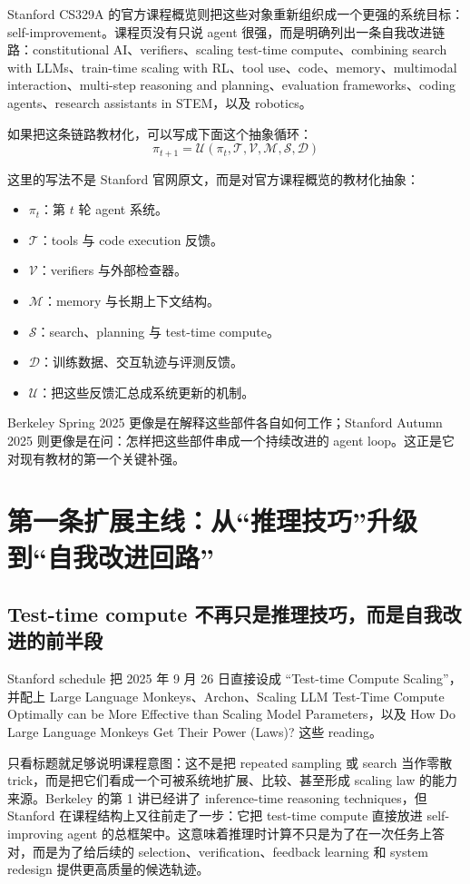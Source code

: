 Stanford CS329A 的官方课程概览则把这些对象重新组织成一个更强的系统目标：self-improvement。课程页没有只说 agent 很强，而是明确列出一条自我改进链路：constitutional AI、verifiers、scaling test-time compute、combining search with LLMs、train-time scaling with RL、tool use、code、memory、multimodal interaction、multi-step reasoning and planning、evaluation frameworks、coding agents、research assistants in STEM，以及 robotics。

如果把这条链路教材化，可以写成下面这个抽象循环：
\[
\pi_{t+1} = \mathcal{U}(\pi_t, \mathcal{T}, \mathcal{V}, \mathcal{M}, \mathcal{S}, \mathcal{D})
\]

这里的写法不是 Stanford 官网原文，而是对官方课程概览的教材化抽象：
\begin{itemize}
\item $\pi_t$：第 $t$ 轮 agent 系统。
\item $\mathcal{T}$：tools 与 code execution 反馈。
\item $\mathcal{V}$：verifiers 与外部检查器。
\item $\mathcal{M}$：memory 与长期上下文结构。
\item $\mathcal{S}$：search、planning 与 test-time compute。
\item $\mathcal{D}$：训练数据、交互轨迹与评测反馈。
\item $\mathcal{U}$：把这些反馈汇总成系统更新的机制。
\end{itemize}

Berkeley Spring 2025 更像是在解释这些部件各自如何工作；Stanford Autumn 2025 则更像是在问：怎样把这些部件串成一个持续改进的 agent loop。这正是它对现有教材的第一个关键补强。

\section{第一条扩展主线：从“推理技巧”升级到“自我改进回路”}

\subsection{Test-time compute 不再只是推理技巧，而是自我改进的前半段}

Stanford schedule 把 2025 年 9 月 26 日直接设成 ``Test-time Compute Scaling''，并配上 Large Language Monkeys、Archon、Scaling LLM Test-Time Compute Optimally can be More Effective than Scaling Model Parameters，以及 How Do Large Language Monkeys Get Their Power (Laws)? 这些 reading。

只看标题就足够说明课程意图：这不是把 repeated sampling 或 search 当作零散 trick，而是把它们看成一个可被系统地扩展、比较、甚至形成 scaling law 的能力来源。Berkeley 的第 1 讲已经讲了 inference-time reasoning techniques，但 Stanford 在课程结构上又往前走了一步：它把 test-time compute 直接放进 self-improving agent 的总框架中。这意味着推理时计算不只是为了在一次任务上答对，而是为了给后续的 selection、verification、feedback learning 和 system redesign 提供更高质量的候选轨迹。

